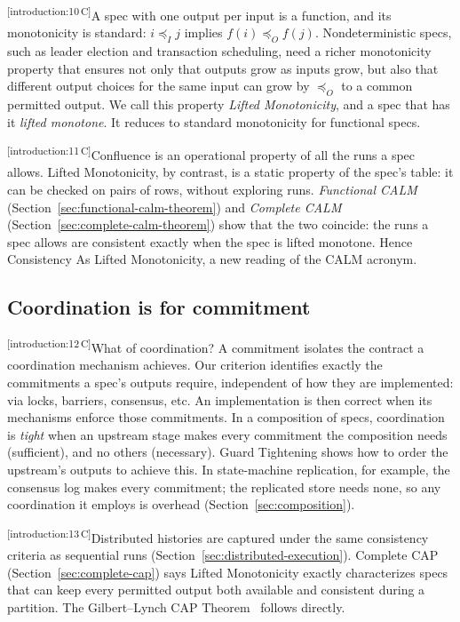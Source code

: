 \documentclass[sigconf]{cidr-2027}
\theoremstyle{remark}
\newcommand{\InputOrd}{\preceq_I}
\newcommand{\OutputOrd}{\preceq_O}
\newcommand{\commitment}{commitment\xspace}
\newcommand{\commitments}{commitments\xspace}
\newcommand{\cxtag}[2]{\textsuperscript{\textsf{\tiny[#1\,#2]}}}
\begin{document}
\color{black!45}\cxtag{introduction:10}{C}A spec with one output per input is a function, and its monotonicity is standard: $i\InputOrd j$
implies $f(i)\OutputOrd f(j)$.  Nondeterministic specs, such as leader election
and transaction scheduling, need a richer monotonicity property that ensures
not only that outputs grow as inputs grow, but also that different output
choices for the same input can grow by $\OutputOrd$ to a common permitted
output.  We call this property \emph{Lifted Monotonicity}, and a spec that has
it \emph{lifted monotone}.  It reduces to standard monotonicity for functional specs.\color{black}

\color{black!45}\cxtag{introduction:11}{C}Confluence is an operational property of all the runs a spec allows.  Lifted Monotonicity,
by contrast, is a static property of the spec's table: it can be checked on
pairs of rows, without exploring runs.  \emph{Functional CALM}
(Section~\ref{sec:functional-calm-theorem}) and \emph{Complete CALM}
(Section~\ref{sec:complete-calm-theorem}) show that the two coincide: the runs a spec allows are consistent exactly when the spec is
lifted monotone.  Hence Consistency As Lifted Monotonicity, a new reading of the
CALM acronym.\color{black}

\subsection{Coordination is for \commitment}
\color{black!45}\cxtag{introduction:12}{C}What of coordination?  A \commitment isolates the contract a coordination
mechanism achieves.  Our criterion identifies exactly the \commitments a
spec's outputs require, independent of how they are implemented: via locks,
barriers, consensus, etc.  An implementation is then correct when its
mechanisms enforce those \commitments.
In a composition of specs, coordination is \emph{tight}
when an upstream stage makes every \commitment the composition needs (sufficient), and no others (necessary).  Guard Tightening shows how to order the upstream's outputs to achieve this.  In state-machine replication, for example, the consensus log
makes every \commitment; the replicated store needs none, so any coordination it employs is overhead (Section~\ref{sec:composition}).\color{black}

\color{black!45}\cxtag{introduction:13}{C}Distributed histories are captured under the same consistency criteria as
sequential runs (Section~\ref{sec:distributed-execution}).  Complete CAP
(Section~\ref{sec:complete-cap}) says Lifted Monotonicity exactly characterizes specs
that can keep every permitted output both available and consistent during a
partition.  The Gilbert--Lynch CAP Theorem~\cite{gilbert2002cap} follows directly.\color{black}
\end{document}
